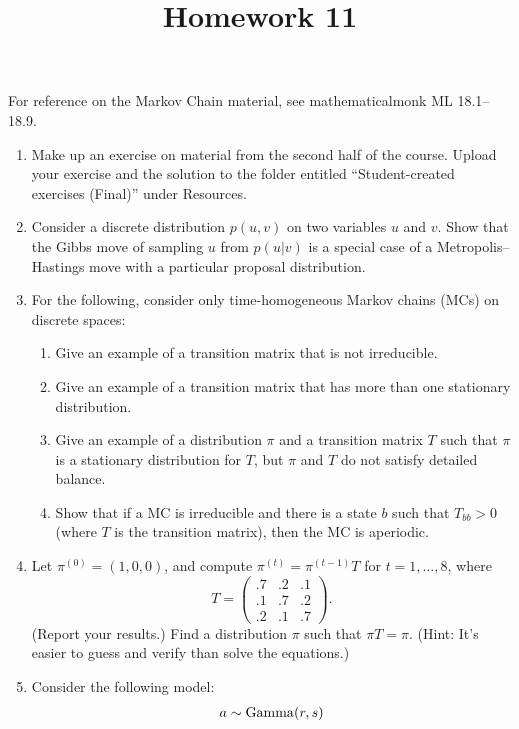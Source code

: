 \documentclass[12pt]{article}
\title{Homework 11}
\author{}
\date{}
\begin{document}
\maketitle

For reference on the Markov Chain material, see mathematicalmonk ML 18.1--18.9.

\begin{enumerate}
    \item Make up an exercise on material from the second half of the course.  Upload your exercise and the solution to the folder entitled
        ``Student-created exercises (Final)'' under Resources.
    \item Consider a discrete distribution $p(u,v)$ on two variables $u$ and $v$. Show that the Gibbs move of sampling $u$ from $p(u|v)$ 
        is a special case of a Metropolis--Hastings move with a particular proposal distribution.
    \item For the following, consider only time-homogeneous Markov chains (MCs) on discrete spaces:
    \begin{enumerate}
        \item Give an example of a transition matrix that is not irreducible.
        \item Give an example of a transition matrix that has more than one stationary distribution.
        \item Give an example of a distribution $\pi$ and a transition matrix $T$ such that $\pi$ is a stationary distribution for $T$, but
            $\pi$ and $T$ do not satisfy detailed balance.
        \item Show that if a MC is irreducible and there is a state $b$ such that $T_{bb}>0$ (where $T$ is the transition matrix),
            then the MC is aperiodic.
    \end{enumerate}
    \item Let $\pi^{(0)}=(1,0,0)$, and compute $\pi^{(t)} = \pi^{(t-1)} T$ for $t=1,\ldots,8$, where 
        $$ T = \begin{pmatrix} .7 & .2 & .1 \\ .1 & .7 & .2 \\ .2 & .1 & .7 \end{pmatrix}. $$
        (Report your results.) Find a distribution $\pi$ such that $\pi T = \pi$. (Hint: It's easier to guess and verify than solve the equations.)
    \item Consider the following model:
        \begin{align*}
            & a \sim \Ga(r,s) \\

\end{align*}
\end{enumerate}
\end{document}
